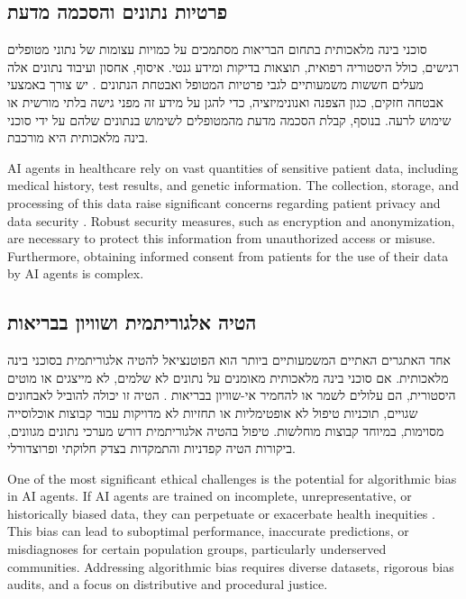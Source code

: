 \documentclass[12pt,a4paper]{article}
\newenvironment{hebrewblock}{%
  \begin{tcolorbox}[enhanced,breakable,
    title={\hebrewfont עברית},
    colback=blue!3!white,colframe=blue!35!white,
    fonttitle=\bfseries,
    attach boxed title to top right={yshift=-2.5mm,xshift=-4mm},
    boxed title style={colback=blue!35!white,sharp corners}]
  \begin{hebrew}
}{%
  \end{hebrew}
  \end{tcolorbox}\medskip
}
\newenvironment{englishblock}{%
  \begin{tcolorbox}[enhanced,breakable,
    title={English Translation},
    colback=gray!4!white,colframe=gray!40!white,
    fonttitle=\bfseries]
}{%
  \end{tcolorbox}\medskip
}
\begin{document}
\subsection{\texthebrew{פרטיות נתונים והסכמה מדעת}}
\label{subsec:data-privacy-hebrew}
\begin{hebrewblock}
סוכני בינה מלאכותית בתחום הבריאות מסתמכים על כמויות עצומות של נתוני מטופלים רגישים, כולל היסטוריה רפואית, תוצאות בדיקות ומידע גנטי. איסוף, אחסון ועיבוד נתונים אלה מעלים חששות משמעותיים לגבי פרטיות המטופל ואבטחת הנתונים \cite{nih_ethical_implications}. יש צורך באמצעי אבטחה חזקים, כגון הצפנה ואנונימיזציה, כדי להגן על מידע זה מפני גישה בלתי מורשית או שימוש לרעה. בנוסף, קבלת הסכמה מדעת מהמטופלים לשימוש בנתונים שלהם על ידי סוכני בינה מלאכותית היא מורכבת.
\end{hebrewblock}
\begin{englishblock}
AI agents in healthcare rely on vast quantities of sensitive patient data, including medical history, test results, and genetic information. The collection, storage, and processing of this data raise significant concerns regarding patient privacy and data security \cite{nih_ethical_implications}. Robust security measures, such as encryption and anonymization, are necessary to protect this information from unauthorized access or misuse. Furthermore, obtaining informed consent from patients for the use of their data by AI agents is complex.
\end{englishblock}

\subsection{\texthebrew{הטיה אלגוריתמית ושוויון בבריאות}}
\label{subsec:algorithmic-bias-hebrew}
\begin{hebrewblock}
אחד האתגרים האתיים המשמעותיים ביותר הוא הפוטנציאל להטיה אלגוריתמית בסוכני בינה מלאכותית. אם סוכני בינה מלאכותית מאומנים על נתונים לא שלמים, לא מייצגים או מוטים היסטורית, הם עלולים לשמר או להחמיר אי-שוויון בבריאות \cite{nih_ethical_implications}. הטיה זו יכולה להוביל לאבחונים שגויים, תוכניות טיפול לא אופטימליות או תחזיות לא מדויקות עבור קבוצות אוכלוסייה מסוימות, במיוחד קבוצות מוחלשות. טיפול בהטיה אלגוריתמית דורש מערכי נתונים מגוונים, ביקורות הטיה קפדניות והתמקדות בצדק חלוקתי ופרוצדורלי.
\end{hebrewblock}
\begin{englishblock}
One of the most significant ethical challenges is the potential for algorithmic bias in AI agents. If AI agents are trained on incomplete, unrepresentative, or historically biased data, they can perpetuate or exacerbate health inequities \cite{nih_ethical_implications}. This bias can lead to suboptimal performance, inaccurate predictions, or misdiagnoses for certain population groups, particularly underserved communities. Addressing algorithmic bias requires diverse datasets, rigorous bias audits, and a focus on distributive and procedural justice.
\end{englishblock}
\end{document}
